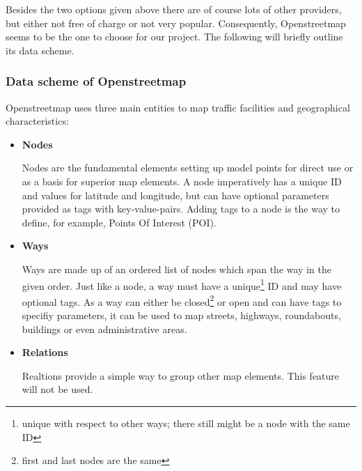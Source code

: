 Besides the two options given above there are of course lots of other providers, but either not free of charge or not very popular. Consequently, Openstreetmap seems to be the one to choose for our project. The following will briefly outline its data scheme.\newline

\subsubsection{Data scheme of Openstreetmap}

Openstreetmap uses three main entities to map traffic facilities and geographical characteristics:

\begin{itemize}

	\item \textbf{Nodes}
	
		Nodes are the fundamental elements setting up model points for direct use or as a basis for superior map elements. A node imperatively has a unique ID and values for latitude and longitude, but can have optional parameters provided as tags with key-value-pairs. Adding tags to a node is the way to define, for example, Points Of Interest (POI).
		
	\item \textbf{Ways}
	
		Ways are made up of an ordered list of nodes which span the way in the given order. Just like a node, a way must have a unique\footnote{unique with respect to other ways; there still might be a node with the same ID} ID and may have optional tags.\newline
		As a way can either be closed\footnote{first and last nodes are the same} or open and can have tags to specifiy parameters, it can be used to map streets, highways, roundabouts, buildings or even administrative areas.	
		
	\item \textbf{Relations}
	
		Realtions provide a simple way to group other map elements. This feature will not be used.
	
\end{itemize}
